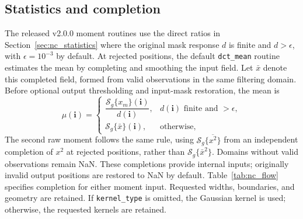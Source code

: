 \documentclass[a4paper,fleqn]{cas-sc}
\begin{document}
\subsection{Statistics and completion}
\label{sec:statistics_implementation}

The released v2.0.0 moment routines use the direct ratios in Section~\ref{sec:nc_statistics} where the original mask response $d$ is finite and $d>\epsilon$, with $\epsilon=10^{-3}$ by default. At rejected positions, the default \texttt{dct\_mean} routine estimates the mean by completing and smoothing the input field. Let $\bar{x}$ denote this completed field, formed from valid observations in the same filtering domain. Before optional output thresholding and input-mask restoration, the mean is
\begin{equation}
	\mu(\mathbf{i})=
	\begin{cases}
		\dfrac{\mathcal{S}_g\{x_m\}(\mathbf{i})}{d(\mathbf{i})}, & d(\mathbf{i})\text{ finite and }>\epsilon, \\
		\mathcal{S}_g\{\bar{x}\}(\mathbf{i}), & \text{otherwise},
	\end{cases}
	\label{eq:mean_stable}
\end{equation}
The second raw moment follows the same rule, using $\mathcal{S}_g\{\overline{x^2}\}$ from an independent completion of $x^2$ at rejected positions, rather than $\mathcal{S}_g\{\bar{x}^2\}$. Domains without valid observations remain NaN. These completions provide internal inputs; originally invalid output positions are restored to NaN by default. Table~\ref{tab:nc_flow} specifies completion for either moment input. Requested widths, boundaries, and geometry are retained. If \texttt{kernel\_type} is omitted, the Gaussian kernel is used; otherwise, the requested kernels are retained.
\end{document}
